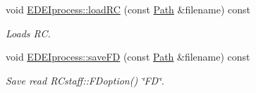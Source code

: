 \begin{DoxyCompactItemize}
void \hyperlink{group__edeiedei_gafbe3ba880d64b341f6cbe684648479ec}{EDEIprocess::loadRC} (const \hyperlink{classPath}{Path} \&filename) const 
\begin{DoxyCompactList}\small\item\em Loads RC. \item\end{DoxyCompactList}\item 
void \hyperlink{group__edeiedei_gae6f313c662a444a4bf5516cf9f83dc8c}{EDEIprocess::saveFD} (const \hyperlink{classPath}{Path} \&filename) const 
\begin{DoxyCompactList}\small\item\em Save read RCstaff::FDoption() \char`\"{}FD\char`\"{}. \item\end{DoxyCompactList}\end{DoxyCompactItemize}
